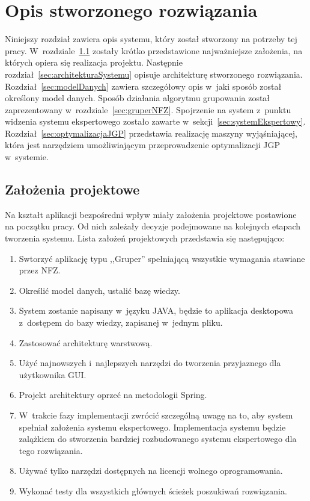 \chapter{Opis stworzonego rozwiązania}
\label{cha:rozwiazanie}

Niniejszy rozdział zawiera opis systemu, który został stworzony na potrzeby tej pracy. W~rozdziale~\ref{sec:zalozeniaProjektowe} zostały krótko przedstawione najważniejsze założenia, na których opiera się realizacja projektu. Następnie rozdział~\ref{sec:architekturaSystemu} opisuje architekturę stworzonego rozwiązania. Rozdział~\ref{sec:modelDanych} zawiera szczegółowy opis w~jaki sposób został określony model danych. Sposób działania algorytmu grupowania został zaprezentowany w~rozdziale~\ref{sec:gruperNFZ}. Spojrzenie na system z~punktu widzenia systemu ekspertowego zostało zawarte w~sekcji~\ref{sec:systemEkspertowy}. Rozdział~\ref{sec:optymalizacjaJGP} przedstawia realizację maszyny wyjąśniającej, która jest narzędziem umożliwiającym przeprowadzenie optymalizacji JGP w~systemie.

\section{Założenia projektowe}
\label{sec:zalozeniaProjektowe}

Na kształt aplikacji bezpośredni wpływ miały założenia projektowe postawione na początku pracy. Od nich zależały decyzje podejmowane na kolejnych etapach tworzenia systemu. Lista założeń projektowych przedstawia się następująco:

\begin{enumerate}
 \item Swtorzyć aplikację typu ,,Gruper'' spełniającą wszystkie wymagania stawiane przez NFZ.
 \item Określić model danych, ustalić bazę wiedzy.
 \item System zostanie napisany w~języku JAVA, będzie to aplikacja desktopowa z~dostępem do bazy wiedzy, zapisanej w~jednym pliku.
 \item Zastosować architekturę warstwową.
 \item Użyć najnowszych i~najlepszych narzędzi do tworzenia przyjaznego dla użytkownika GUI.
 \item Projekt architektury oprzeć na metodologii Spring.
 \item W~trakcie fazy implementacji zwrócić szczególną uwagę na to, aby system spełniał założenia systemu ekspertowego. Implementacja systemu będzie zalążkiem do stworzenia bardziej rozbudowanego systemu ekspertowego dla tego rozwiązania.
 \item Używać tylko narzędzi dostępnych na licencji wolnego oprogramowania.
 \item Wykonać testy dla wszystkich głównych ścieżek poszukiwań rozwiązania.
\end{enumerate}

